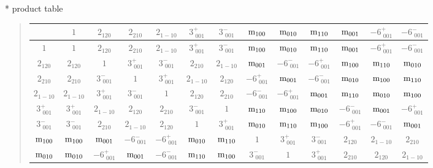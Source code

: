 \documentclass[fleqn,10pt,landscape]{jsarticle}
\begin{document}
* product table
\begin{quote}
\begin{tabular}{ccccccccccccc} \hline \hline
 & $ 1 $ & $ 2{}_{120} $ & $ 2{}_{210} $ & $ 2{}_{1-10} $ & $ 3^{+}_{\,\,001} $ & $ 3^{-}_{\,\,001} $ & $ {\rm m}_{100} $ & $ {\rm m}_{010} $ & $ {\rm m}_{110} $ & $ {\rm m}_{001} $ & $ -6^{+}_{\,\,001} $ & $ -6^{-}_{\,\,001} $ \\ \hline
$ 1 $ & $ 1 $ & $ 2{}_{120} $ & $ 2{}_{210} $ & $ 2{}_{1-10} $ & $ 3^{+}_{\,\,001} $ & $ 3^{-}_{\,\,001} $ & $ {\rm m}_{100} $ & $ {\rm m}_{010} $ & $ {\rm m}_{110} $ & $ {\rm m}_{001} $ & $ -6^{+}_{\,\,001} $ & $ -6^{-}_{\,\,001} $ \\
$ 2{}_{120} $ & $ 2{}_{120} $ & $ 1 $ & $ 3^{+}_{\,\,001} $ & $ 3^{-}_{\,\,001} $ & $ 2{}_{210} $ & $ 2{}_{1-10} $ & $ {\rm m}_{001} $ & $ -6^{-}_{\,\,001} $ & $ -6^{+}_{\,\,001} $ & $ {\rm m}_{100} $ & $ {\rm m}_{110} $ & $ {\rm m}_{010} $ \\
$ 2{}_{210} $ & $ 2{}_{210} $ & $ 3^{-}_{\,\,001} $ & $ 1 $ & $ 3^{+}_{\,\,001} $ & $ 2{}_{1-10} $ & $ 2{}_{120} $ & $ -6^{+}_{\,\,001} $ & $ {\rm m}_{001} $ & $ -6^{-}_{\,\,001} $ & $ {\rm m}_{010} $ & $ {\rm m}_{100} $ & $ {\rm m}_{110} $ \\
$ 2{}_{1-10} $ & $ 2{}_{1-10} $ & $ 3^{+}_{\,\,001} $ & $ 3^{-}_{\,\,001} $ & $ 1 $ & $ 2{}_{120} $ & $ 2{}_{210} $ & $ -6^{-}_{\,\,001} $ & $ -6^{+}_{\,\,001} $ & $ {\rm m}_{001} $ & $ {\rm m}_{110} $ & $ {\rm m}_{010} $ & $ {\rm m}_{100} $ \\
$ 3^{+}_{\,\,001} $ & $ 3^{+}_{\,\,001} $ & $ 2{}_{1-10} $ & $ 2{}_{120} $ & $ 2{}_{210} $ & $ 3^{-}_{\,\,001} $ & $ 1 $ & $ {\rm m}_{110} $ & $ {\rm m}_{100} $ & $ {\rm m}_{010} $ & $ -6^{-}_{\,\,001} $ & $ {\rm m}_{001} $ & $ -6^{+}_{\,\,001} $ \\
$ 3^{-}_{\,\,001} $ & $ 3^{-}_{\,\,001} $ & $ 2{}_{210} $ & $ 2{}_{1-10} $ & $ 2{}_{120} $ & $ 1 $ & $ 3^{+}_{\,\,001} $ & $ {\rm m}_{010} $ & $ {\rm m}_{110} $ & $ {\rm m}_{100} $ & $ -6^{+}_{\,\,001} $ & $ -6^{-}_{\,\,001} $ & $ {\rm m}_{001} $ \\
$ {\rm m}_{100} $ & $ {\rm m}_{100} $ & $ {\rm m}_{001} $ & $ -6^{-}_{\,\,001} $ & $ -6^{+}_{\,\,001} $ & $ {\rm m}_{010} $ & $ {\rm m}_{110} $ & $ 1 $ & $ 3^{+}_{\,\,001} $ & $ 3^{-}_{\,\,001} $ & $ 2{}_{120} $ & $ 2{}_{1-10} $ & $ 2{}_{210} $ \\
$ {\rm m}_{010} $ & $ {\rm m}_{010} $ & $ -6^{+}_{\,\,001} $ & $ {\rm m}_{001} $ & $ -6^{-}_{\,\,001} $ & $ {\rm m}_{110} $ & $ {\rm m}_{100} $ & $ 3^{-}_{\,\,001} $ & $ 1 $ & $ 3^{+}_{\,\,001} $ & $ 2{}_{210} $ & $ 2{}_{120} $ & $ 2{}_{1-10} $ \\

\end{tabular}
\end{quote}
\end{document}
